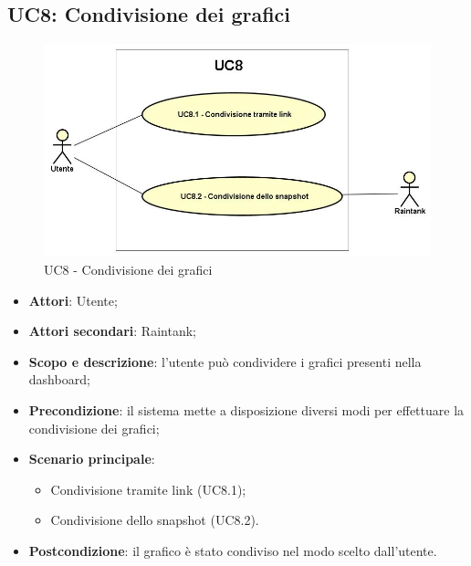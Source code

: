 \subsection{UC8: Condivisione dei grafici}
\hypertarget{UC8}{}
\begin{figure} [H]
	\centering
	\includegraphics[scale=0.45]{Img/UC8}
	\caption{UC8 - Condivisione dei grafici}\label{}
\end{figure}
\begin{itemize}
	\item \textbf{Attori}: Utente;
	\item \textbf{Attori secondari}: Raintank;
	\item \textbf{Scopo e descrizione}: l'utente può condividere i grafici presenti nella dashboard;
	\item \textbf{Precondizione}: il sistema mette a disposizione diversi modi per effettuare la condivisione dei grafici;
	\item \textbf{Scenario principale}:
	\begin{itemize}
		\item Condivisione tramite link (UC8.1);	
		\item Condivisione dello snapshot (UC8.2).
	\end{itemize}
	\item \textbf{Postcondizione}: il grafico è stato condiviso nel modo scelto dall'utente.
	
\end{itemize}

